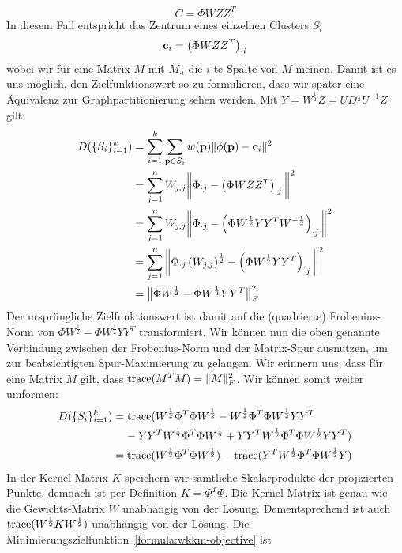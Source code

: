 \[ C = \Phi W Z Z^T \]
In diesem Fall entspricht das Zentrum eines einzelnen Clusters $S_i$
\[ \mathbf{c}_i = \left(\Phi W Z Z^T\right)_{\cdot i} \]
wobei wir für eine Matrix $M$ mit $M_{\cdot i}$ die $i$-te Spalte von $M$ meinen. Damit ist es uns möglich, den
Zielfunktionswert so zu formulieren, dass wir später eine Äquivalenz zur Graphpartitionierung sehen werden. Mit
$Y = W^{\frac{1}{2}} Z = U D^{\frac{1}{2}} U^{-1} Z$ gilt:
\begin{align*}
	D(\{S_i\}_{i=1}^{k}) &= \sum_{i=1}^{k} \sum_{\mathbf{p} \in S_i} w(\mathbf{p}) \lVert {\phi(\ensuremath{\mathbf{p}})} - {\mathbf{c}_i} \rVert^2 \\
		&= \sum_{j=1}^{n} W_{j,j} \bigg\lVert \Phi_{\cdot j} - \left( \Phi W Z Z^T \right)_{\cdot j} \bigg\rVert^2 \\
		&= \sum_{j=1}^{n} W_{j,j} \bigg\lVert \Phi_{\cdot j} - \left( \Phi W^{\frac{1}{2}} Y Y^T W^{-\frac{1}{2}} \right)_{\cdot j} \bigg\rVert^2 \\
		&= \sum_{j=1}^{n} \bigg\lVert \Phi_{\cdot j} \left(W_{j,j}\right)^{\frac{1}{2}} - \left( \Phi W^{\frac{1}{2}} Y Y^T \right)_{\cdot j} \bigg\rVert^2 \\
		&= \big\lVert \Phi W^{\frac{1}{2}} - \Phi W^{\frac{1}{2}} Y Y^T \big\rVert_F^2
\end{align*}
Der ursprüngliche Zielfunktionswert ist damit auf die (quadrierte) Frobenius-Norm von
$\Phi W^{\frac{1}{2}} - \Phi W^{\frac{1}{2}} Y Y^T$ transformiert.
Wir können nun die oben genannte Verbindung zwischen der Frobenius-Norm und der Matrix-Spur ausnutzen, um zur beabsichtigten
Spur-Maximierung zu gelangen. Wir erinnern uns, dass für eine Matrix $M$ gilt, dass $\operatorname*{trace}(M^TM) = \lVert{M}\rVert_F^2$. Wir können
somit weiter umformen:
\begin{align*}
	D(\{S_i\}_{i=1}^{k}) &= \operatorname*{trace}( W^{\frac{1}{2}} \Phi^T \Phi W^{\frac{1}{2}} - W^{\frac{1}{2}} \Phi^T \Phi W^{\frac{1}{2}} Y Y^T \\
		& \; \; \; \; - Y Y^T W^{\frac{1}{2}} \Phi^T \Phi W^{\frac{1}{2}} + Y Y^T W^{\frac{1}{2}} \Phi^T \Phi W^{\frac{1}{2}} Y Y^T ) \\
		&= \operatorname*{trace}( W^{\frac{1}{2}} \Phi^T \Phi W^{\frac{1}{2}} ) - \operatorname*{trace}( Y^T W^{\frac{1}{2}} \Phi^T \Phi W^{\frac{1}{2}} Y )
\end{align*}
In der Kernel-Matrix $K$ speichern wir sämtliche Skalarprodukte der projizierten Punkte, demnach ist per Definition
$K = \Phi^T \Phi$.
Die Kernel-Matrix ist genau wie die Gewichts-Matrix $W$ unabhängig von der Lösung. Dementsprechend ist auch
$\operatorname*{trace}( W^{\frac{1}{2}} K W^{\frac{1}{2}} )$ unabhängig von der Lösung. Die Minimierungszielfunktion~\ref{formula:wkkm-objective} ist
